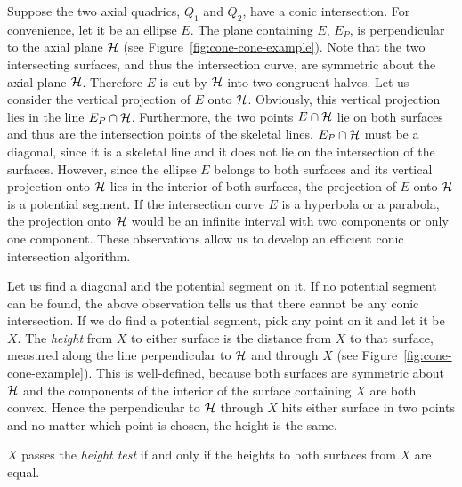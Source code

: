      Suppose the two axial quadrics, $Q_1$ and $Q_2$, have a conic 
intersection.  For convenience, let it be an ellipse $E$.  The plane containing
$E$, $E_P$, is perpendicular to the axial plane ${\cal H}$ (see 
Figure~\ref{fig:cone-cone-example}).  Note that the two intersecting surfaces,
and thus the intersection curve, are symmetric about the axial plane 
${\cal H}$.  Therefore $E$ is cut by ${\cal H}$ into two congruent halves.
Let us consider the vertical projection of $E$ onto ${\cal H}$.  Obviously, 
this vertical projection lies in the line $E_P\cap{\cal H}$.  Furthermore,
the two points $E\cap{\cal H}$ lie on both surfaces and thus are the 
intersection points of the skeletal lines.  $E_P\cap{\cal H}$ must be a 
diagonal, since it is a skeletal line and it does not lie on the intersection 
of the surfaces.  However, since the ellipse $E$ belongs to both surfaces and 
its vertical projection onto ${\cal H}$ lies in the interior of both surfaces,
the projection of $E$ onto ${\cal H}$ is a potential segment.  If the 
intersection curve $E$ is a hyperbola or a parabola, the projection onto 
${\cal H}$ would be an infinite interval with two components or only one 
component.  These observations allow us to develop an efficient conic 
intersection algorithm.

     Let us find a diagonal and the potential segment on it.  If no potential 
segment can be found, the above observation tells us that there cannot be any 
conic intersection.  If we do find a potential segment, pick any point on it 
and let it be $X$.  The {\em height} from $X$ to either surface is the 
distance from $X$ to that surface, measured along the line perpendicular to 
${\cal H}$ and through $X$ (see Figure~\ref{fig:cone-cone-example}).  This is 
well-defined, because both surfaces are symmetric about ${\cal H}$ and the 
components of the interior of the surface containing $X$ are both convex.  
Hence the perpendicular to ${\cal H}$ through $X$ hits either surface in two 
points and no matter which point is chosen, the height is the same.  

\begin{definition}
     $X$ passes the {\em height test} if and only if the heights to both 
surfaces from $X$ are equal.
\end{definition}


